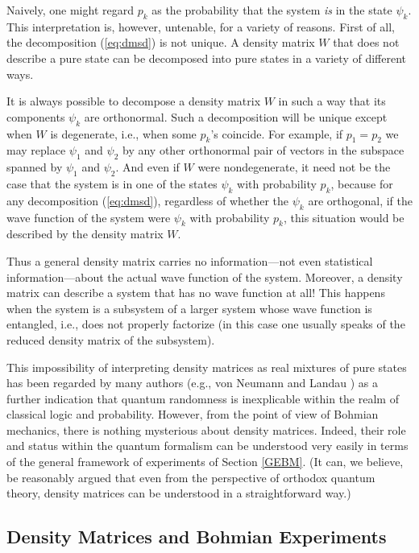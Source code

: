 \documentclass[12pt]{article}
\newcommand{\eq}[1]{(\ref{#1})}
\newcommand{\wf}{wave function}
\begin{document}
Naively, one might regard $p_{k}$ as the probability that the system
\emph{is} in the state $\psi_{k}$.  This interpretation is, however,
untenable, for a variety of reasons. First of all, the decomposition
\eq{eq:dmsd} is not unique. A density matrix $W$ that does not
describe a pure state can be decomposed into pure states in a variety
of different ways.

It is always possible to decompose a density matrix $W$ in such a way
that its components $\psi_k$ are orthonormal. Such a decomposition
will be unique except when $W$ is degenerate, i.e., when some $p_k$'s
coincide. For example, if $p_1=p_2$ we may replace $\psi_{1}$ and
$\psi_{2}$ by any other orthonormal pair of vectors in the subspace
spanned by $\psi_{1}$ and $\psi_{2}$. And even if $W$ were
nondegenerate, it need not be the case that the system is in one of
the states $\psi_k$ with probability $p_k$, because for any
decomposition \eq{eq:dmsd}, regardless of whether the $\psi_k$ are
orthogonal, if the \wf{} of the system were $\psi_k$ with probability
$p_k$, this situation would be described by the density matrix $W$.



Thus a general density matrix carries no information---not even
statistical information---about the actual \wf{} of the system.
Moreover, a density matrix can describe a system that has no wave
function at all!  This happens when the system is a subsystem of a
larger system whose \wf{} is entangled, i.e., does not properly
factorize (in this case one usually speaks of the reduced density
matrix of the subsystem).

This impossibility of interpreting density matrices as real mixtures
of pure states has been regarded by many authors (e.g., von Neumann
\cite{vNe55} and Landau \cite{LL}) as a further indication that
quantum randomness is inexplicable within the realm of classical logic
and probability.  However, {}from the point of view of Bohmian
mechanics, there is nothing mysterious about density matrices.
Indeed, their role and status within the quantum formalism can be
understood very easily in terms of the general framework of
experiments of Section \ref{GEBM}. (It can, we believe, be reasonably
argued that even {}from the perspective of orthodox quantum theory,
density matrices can be understood in a straightforward way.)

\subsection{Density Matrices and Bohmian Experiments}
\label{secRWF}
\end{document}
